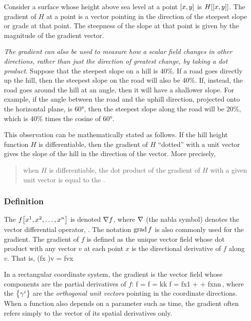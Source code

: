 Consider a surface whose height above sea level at a point $\left[{x,y}\right]$ is $H\!\left[{\left[{x,y}\right]}\right]$. The gradient of $H$ at a point is a vector pointing in the direction of the steepest slope or grade at that point. The steepness of the slope at that point is given by the magnitude of the gradient vector.

\emph{The gradient can also be used to measure how a scalar field changes in other directions, rather than just the direction of greatest change, by taking a dot product}. Suppose that the steepest slope on a hill is 40\%. If a road goes directly up the hill, then the steepest slope on the road will also be 40\%. If, instead, the road goes around the hill at an angle, then it will have a shallower slope. For example, if the angle between the road and the uphill direction, projected onto the horizontal plane, is \ang{60}, then the steepest slope along the road will be 20\%, which is 40\% times the cosine of \ang{60}.

This observation can be mathematically stated as follows. If the hill height function $H$ is differentiable, then the gradient of $H$ ``dotted'' with a unit vector gives the slope of the hill in the direction of the vector. More precisely, 
\begin{quote}
when $H$ is differentiable, the dot product of the gradient of $H$ with a given unit vector is equal to the .
\end{quote}


\subsubsection{Definition}
The  $f\!\left[{{x}^{1}, {x}^{2}, \dotsc, {x}^{n}}\right]$ is denoted $\nabla f$, where $\nabla$ (the nabla symbol) denotes the vector differential operator, . The notation $\operatorname{grad} f$ is also commonly used for the gradient. The gradient of $f$ is defined as the unique vector field whose dot product with any vector $v$ at each point $x$ is the directional derivative of $f$ along $v$. That is,
\beq
\left(\gder f\vat x \right)\iprod v = \dder fv\vat x
\eeq

In a rectangular coordinate system, the gradient is the vector field whose components are the partial derivatives of $f$:
\beq
\gder f = \grad f = \rfvec k\igder k f = \xpd f{\comp x1} + \dotsb + \xpd f{\comp xn}\dbvec n\,,
\eeq
where the $\left\lbrace{\gamma^{i}}\right\rbrace$ are the \emph{orthogonal unit vectors} pointing in the coordinate directions. When a function also depends on a parameter such as time, the gradient often refers simply to the vector of its spatial derivatives only.


